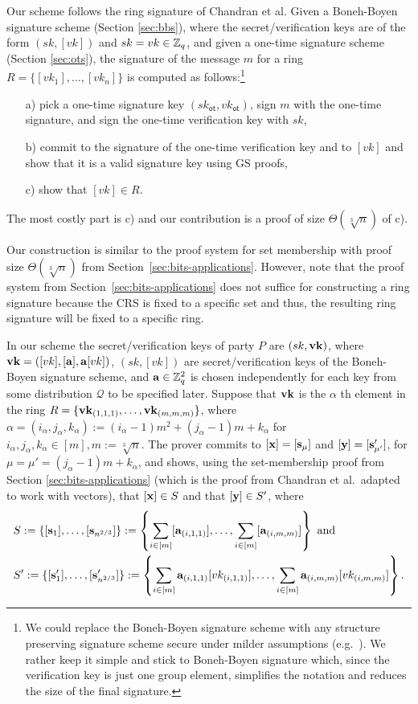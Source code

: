 Our scheme follows the ring signature of Chandran et al. Given a {Boneh-Boyen signature scheme} (Section \ref{sec:bbs}), where the secret/verification keys are of the form $(sk,[vk])$ and $sk=vk\in\mathbb{Z}_q$, and given a {one-time signature scheme} (Section \ref{sec:ots}), the signature of the message $m$ for a ring $R=\{[vk_1],\ldots,[vk_n]\}$ is computed as follows:\footnote{We could replace the Boneh-Boyen signature scheme with any structure preserving signature scheme secure under milder assumptions (e.g.~\cite{EPRINT:JutRoy17}). We rather keep it simple and stick to Boneh-Boyen signature which, since the verification key is just one group element, simplifies the notation and reduces the size of the final signature.}
\begin{itemize}
\item[a)] pick a one-time signature key $(sk_\mathsf{ot},vk_\mathsf{ot})$, sign $m$ with the one-time signature, and sign the one-time verification key with $sk$,
\item[b)] commit to the signature of the one-time verification key and to $[vk]$ and show that it is a valid signature key using GS proofs,
\item[c)] show that $[vk]\in R$.
\end{itemize}
The most costly part is c) and our contribution is a proof of size $\Theta(\sqrt[3]{n})$ of c).

Our construction is similar to the proof system for set membership with proof size $\Theta(\sqrt[3]{n})$ from Section~\ref{sec:bits-applications}. However, note that the proof system from Section~\ref{sec:bits-applications} does not suffice for constructing a ring signature because the CRS is fixed to a specific set and thus, the resulting ring signature will be fixed to a specific ring. 

In our scheme the secret/verification keys of party $P$ are $(sk,\mathbf{vk})$, where $\mathbf{vk}=([vk],[\mathbf{a}],\mathbf{a}[vk])$, $(sk,[vk])$ are secret/verification keys of the Boneh-Boyen signature scheme, and $\mathbf{a}\in\mathbb{Z}_q^2$ is chosen independently for each key from some distribution $\mathcal{Q}$ to be specified later. Suppose that $\mathbf{vk}$ is the $\alpha$ th element in the ring $R=\{\mathbf{vk}_{(1,1,1)},\ldots,\mathbf{vk}_{(m,m,m)}\}$, where $\alpha=(i_\alpha,j_\alpha,k_\alpha):=(i_\alpha-1)m^2+(j_\alpha-1)m+k_\alpha$ for $i_\alpha,j_\alpha,k_\alpha\in[m],m:=\sqrt[3]{n}$. The prover commits to $[\mathbf{x}]=[\mathbf{s}_\mu]$ and $[\mathbf{y}]=[\mathbf{s}'_{\mu'}]$, for $\mu=\mu'=(j_\alpha-1)m+k_\alpha$, and shows, using the set-membership proof from Section \ref{sec:bits-applications} (which is the proof from Chandran et al.~adapted to work with vectors), that $[\mathbf{x}]\in S$ and that $[\mathbf{y}]\in S'$, 
where
\begin{align*}
&S:=\{[\mathbf{s}_1],\ldots,[\mathbf{s}_{n^{2/3}}]\}:=\left\{\sum_{i\in[m]}[\mathbf{a}_{(i,1,1)}],\ldots,\sum_{i\in[m]}[\mathbf{a}_{(i,m,m)}]\right\}\text{ and }\\
&S':=\{[\mathbf{s}'_1],\ldots,[\mathbf{s}'_{n^{2/3}}]\}:=\left\{\sum_{i\in[m]}\mathbf{a}_{(i,1,1)}[vk_{(i,1,1)}],\ldots,\sum_{i\in[m]}\mathbf{a}_{(i,m,m)}[vk_{(i,m,m)}]\right\}.
\end{align*}

